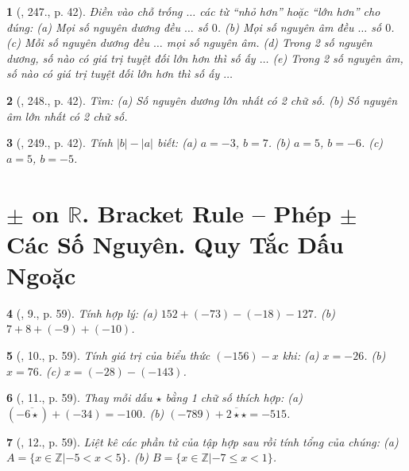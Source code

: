 \documentclass{article}
\newtheorem{baitoan}{}
\begin{document}
\begin{baitoan}[\cite{Binh_Toan_6_tap_1}, 247., p. 42]
	Điền vào chỗ trống $\ldots$ các từ ``nhỏ hơn'' hoặc ``lớn hơn'' cho đúng: (a) Mọi số nguyên dương đều $\ldots$ số $0$. (b) Mọi số nguyên âm đều $\ldots$ số $0$. (c) Mỗi số nguyên dương đều $\ldots$ mọi số nguyên âm. (d) Trong 2 số nguyên dương, số nào có giá trị tuyệt đối lớn hơn thì số ấy $\ldots$ (e) Trong 2 số nguyên âm, số nào có giá trị tuyệt đối lớn hơn thì số ấy $\ldots$	
\end{baitoan}

\begin{baitoan}[\cite{Binh_Toan_6_tap_1}, 248., p. 42]
	Tìm: (a) Số nguyên dương lớn nhất có 2 chữ số. (b) Số nguyên âm lớn nhất có 2 chữ số.	
\end{baitoan}

\begin{baitoan}[\cite{Binh_Toan_6_tap_1}, 249., p. 42]
	Tính $|b| - |a|$ biết: (a) $a = -3$, $b = 7$. (b) $a = 5$, $b = -6$. (c) $a = 5$, $b = -5$.
\end{baitoan}


\section{$\pm$ on $\mathbb{R}$. Bracket Rule -- Phép $\pm$ Các Số Nguyên. Quy Tắc Dấu Ngoặc}

\begin{baitoan}[\cite{Trong_Toan_6_2021}, 9., p. 59]
	Tính hợp lý: (a) $152 + (-73) - (-18) - 127$. (b) $7 + 8 + (-9) + (-10)$.
\end{baitoan}

\begin{baitoan}[\cite{Trong_Toan_6_2021}, 10., p. 59]
	Tính giá trị của biểu thức $(-156) - x$ khi: (a) $x = -26$. (b) $x = 76$. (c) $x = (-28) - (-143)$.
\end{baitoan}

\begin{baitoan}[\cite{Trong_Toan_6_2021}, 11., p. 59]
	Thay mỗi dấu $\star$ bằng 1 chữ số thích hợp: (a) $(-\overline{6\star}) + (-34) = -100$. (b) $(-789) + \overline{2\star\star} = -515$.
\end{baitoan}

\begin{baitoan}[\cite{Trong_Toan_6_2021}, 12., p. 59]
	Liệt kê các phần tử của tập hợp sau rồi tính tổng của chúng: (a) $A = \{x\in\mathbb{Z}|- 5 < x < 5\}$. (b) $B = \{x\in\mathbb{Z}|-7\le x < 1\}$.
\end{baitoan}
\end{document}
